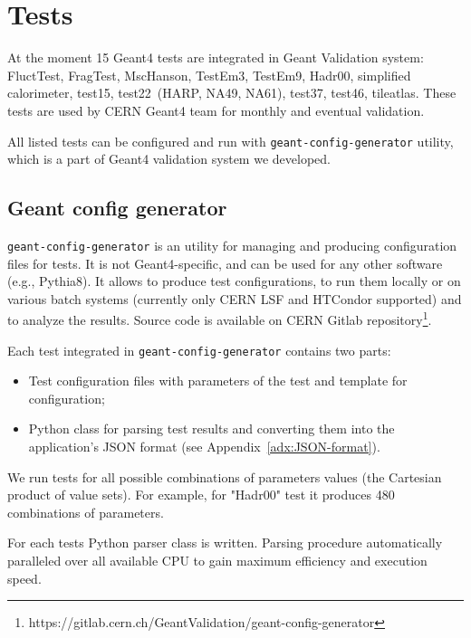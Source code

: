 \section{Tests}
\label{sec-tests}

At the moment 15 Geant4 tests are integrated in Geant Validation system: FluctTest, FragTest, MscHanson, TestEm3, TestEm9, Hadr00, simplified calorimeter, test15, test22~(HARP, NA49, NA61), test37, test46, tileatlas. These tests are used by CERN Geant4 team for monthly and eventual validation.

All listed tests can be configured and run with {\tt geant-config-generator} utility, which is a part of Geant4 validation system we developed.

\subsection{Geant config generator}
\label{sec-geant-config-generator}

{\tt geant-config-generator} is an utility for managing and producing configuration files for tests. It is not Geant4-specific, and can be used for any other software (e.g., Pythia8). It allows to produce test configurations, to run them locally or on various batch systems (currently only CERN LSF and HTCondor supported) and to analyze the results. Source code is available on
CERN Gitlab repository\footnote{https://gitlab.cern.ch/GeantValidation/geant-config-generator}.

Each test integrated in {\tt geant-config-generator} contains two parts:

\begin{itemize}
	\item Test configuration files with parameters of the test and template for configuration;
	\item Python class for parsing test results and converting them into the application's JSON format (see Appendix~\ref{adx:JSON-format}).
\end{itemize}

We run tests for all possible combinations of parameters values (the Cartesian product of value sets). For example, for "Hadr00" test it produces 480 combinations of parameters.

For each tests Python parser class is written. Parsing procedure automatically paralleled over all available CPU to gain maximum efficiency and execution speed.


